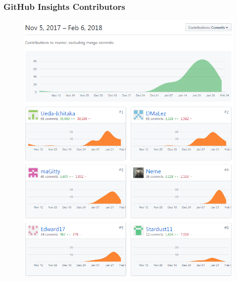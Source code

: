 \documentclass[11pt, usepdftitle=false,...]{beamer}
\begin{document}
			\begin{frame}
				\frametitle{GitHub Insights Contributors}
				\begin{figure}[ht] 
					\centering
					\includegraphics[scale=0.30, trim= 1cm 0 0 0]{contributors.png}
					\label{fig2}
				\end{figure}
			\end{frame}	
			
%			
	
\end{document}
